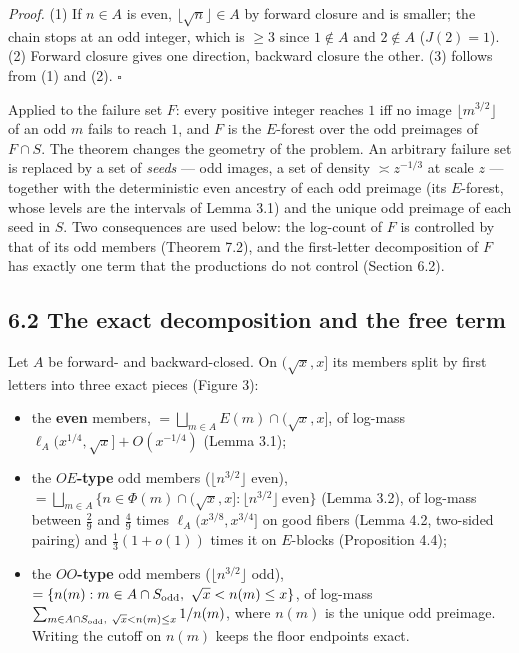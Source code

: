 \documentclass[11pt,a4paper]{article}
\providecommand{\tightlist}{\setlength{\itemsep}{0pt}\setlength{\parskip}{0pt}}
\begin{document}
\emph{Proof.} (1) If \(n\in A\) is even, \(\lfloor\sqrt n\rfloor\in A\)
by forward closure and is smaller; the chain stops at an odd integer,
which is \(\ge 3\) since \(1\notin A\) and \(2\notin A\) (\(J(2)=1\)).
(2) Forward closure gives one direction, backward closure the other. (3)
follows from (1) and (2). \(\square\)

Applied to the failure set \(F\): every positive integer reaches \(1\)
iff no image \(\lfloor m^{3/2}\rfloor\) of an odd \(m\) fails to reach
\(1\), and \(F\) is the \(E\)-forest over the odd preimages of
\(F\cap S\). The theorem changes the geometry of the problem. An
arbitrary failure set is replaced by a set of \emph{seeds} --- odd
images, a set of density \(\asymp z^{-1/3}\) at scale \(z\) --- together
with the deterministic even ancestry of each odd preimage (its
\(E\)-forest, whose levels are the intervals of Lemma 3.1) and the
unique odd preimage of each seed in \(S\). Two consequences are used
below: the log-count of \(F\) is controlled by that of its odd members
(Theorem 7.2), and the first-letter decomposition of \(F\) has exactly
one term that the productions do not control (Section 6.2).

\subsection{6.2 The exact decomposition and the free
term}\label{the-exact-decomposition-and-the-free-term}

Let \(A\) be forward- and backward-closed. On \((\sqrt x,x]\) its
members split by first letters into three exact pieces (Figure 3):

\begin{itemize}
\tightlist
\item
  the \textbf{even} members, \(=\bigsqcup_{m\in A}E(m)\cap(\sqrt x,x]\),
  of log-mass \(\ell_A(x^{1/4},\sqrt x]+O(x^{-1/4})\) (Lemma 3.1);
\item
  the \textbf{\(OE\)-type} odd members (\(\lfloor n^{3/2}\rfloor\)
  even),
  \(=\bigsqcup_{m\in A}\{n\in\Phi(m)\cap(\sqrt x,x]:\lfloor n^{3/2}\rfloor\ \text{even}\}\)
  (Lemma 3.2), of log-mass between \(\tfrac29\) and \(\tfrac49\) times
  \(\ell_A(x^{3/8},x^{3/4}]\) on good fibers (Lemma 4.2, two-sided
  pairing) and \(\tfrac13(1+o(1))\) times it on \(E\)-blocks
  (Proposition 4.4);
\item
  the \textbf{\(OO\)-type} odd members (\(\lfloor n^{3/2}\rfloor\) odd),
  \(=\{n(m):m\in A\cap S_{\rm odd},\ \sqrt x<n(m)\le x\}\), of log-mass
  \(\sum_{m\in A\cap S_{\rm odd},\ \sqrt x<n(m)\le x}1/n(m)\), where
  \(n(m)\) is the unique odd preimage. Writing the cutoff on \(n(m)\)
  keeps the floor endpoints exact.
\end{itemize}
\end{document}
